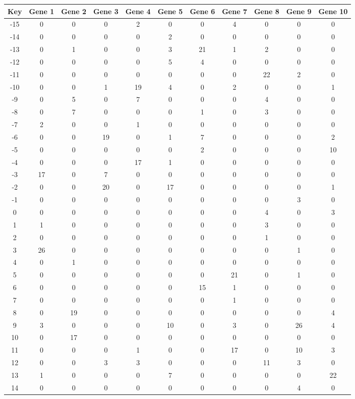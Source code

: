 \begin{tabular}{|c|c|c|c|c|c|c|c|c|c|c|}
\hline
Key & Gene 1 & Gene 2 & Gene 3 & Gene 4 & Gene 5 & Gene 6 & Gene 7 & Gene 8 & Gene 9 & Gene 10 \\
\hline
-15 & 0 & 0 & 0 & 2 & 0 & 0 & 4 & 0 & 0 & 0 \\
-14 & 0 & 0 & 0 & 0 & 2 & 0 & 0 & 0 & 0 & 0 \\
-13 & 0 & 1 & 0 & 0 & 3 & 21 & 1 & 2 & 0 & 0 \\
-12 & 0 & 0 & 0 & 0 & 5 & 4 & 0 & 0 & 0 & 0 \\
-11 & 0 & 0 & 0 & 0 & 0 & 0 & 0 & 22 & 2 & 0 \\
-10 & 0 & 0 & 1 & 19 & 4 & 0 & 2 & 0 & 0 & 1 \\
-9 & 0 & 5 & 0 & 7 & 0 & 0 & 0 & 4 & 0 & 0 \\
-8 & 0 & 7 & 0 & 0 & 0 & 1 & 0 & 3 & 0 & 0 \\
-7 & 2 & 0 & 0 & 1 & 0 & 0 & 0 & 0 & 0 & 0 \\
-6 & 0 & 0 & 19 & 0 & 1 & 7 & 0 & 0 & 0 & 2 \\
-5 & 0 & 0 & 0 & 0 & 0 & 2 & 0 & 0 & 0 & 10 \\
-4 & 0 & 0 & 0 & 17 & 1 & 0 & 0 & 0 & 0 & 0 \\
-3 & 17 & 0 & 7 & 0 & 0 & 0 & 0 & 0 & 0 & 0 \\
-2 & 0 & 0 & 20 & 0 & 17 & 0 & 0 & 0 & 0 & 1 \\
-1 & 0 & 0 & 0 & 0 & 0 & 0 & 0 & 0 & 3 & 0 \\
0 & 0 & 0 & 0 & 0 & 0 & 0 & 0 & 4 & 0 & 3 \\
1 & 1 & 0 & 0 & 0 & 0 & 0 & 0 & 3 & 0 & 0 \\
2 & 0 & 0 & 0 & 0 & 0 & 0 & 0 & 1 & 0 & 0 \\
3 & 26 & 0 & 0 & 0 & 0 & 0 & 0 & 0 & 1 & 0 \\
4 & 0 & 1 & 0 & 0 & 0 & 0 & 0 & 0 & 0 & 0 \\
5 & 0 & 0 & 0 & 0 & 0 & 0 & 21 & 0 & 1 & 0 \\
6 & 0 & 0 & 0 & 0 & 0 & 15 & 1 & 0 & 0 & 0 \\
7 & 0 & 0 & 0 & 0 & 0 & 0 & 1 & 0 & 0 & 0 \\
8 & 0 & 19 & 0 & 0 & 0 & 0 & 0 & 0 & 0 & 4 \\
9 & 3 & 0 & 0 & 0 & 10 & 0 & 3 & 0 & 26 & 4 \\
10 & 0 & 17 & 0 & 0 & 0 & 0 & 0 & 0 & 0 & 0 \\
11 & 0 & 0 & 0 & 1 & 0 & 0 & 17 & 0 & 10 & 3 \\
12 & 0 & 0 & 3 & 3 & 0 & 0 & 0 & 11 & 3 & 0 \\
13 & 1 & 0 & 0 & 0 & 7 & 0 & 0 & 0 & 0 & 22 \\
14 & 0 & 0 & 0 & 0 & 0 & 0 & 0 & 0 & 4 & 0 \\
\hline
\end{tabular}
